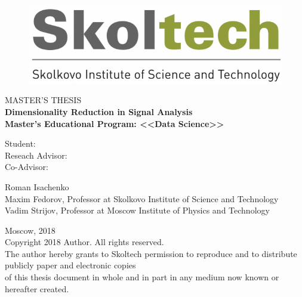 \documentclass[12pt,oneside]{article}
\theoremstyle{definition}
\newcommand{\borders}{\tikz[remember picture,overlay] \draw []
	(current page text area.south west)
	rectangle
	(current page text area.north east)
	;}
\begin{document}
	\pagestyle{empty}
	
	\begin{figure}
		\vspace{1.7cm}
		\centering
		\includegraphics[width=0.38\linewidth]{sk_logo}
	\end{figure}
	\begin{center}
		\sc
		MASTER'S THESIS\\[5mm]
		\bf{ \large
		Dimensionality Reduction in Signal Analysis}\\[25mm]
		\rm
		Master's Educational Program: <<Data Science>>\\[10mm]
	\end{center}
		\begin{minipage}{0.5\linewidth}
		\begin{flushright}
		Student: \hphantom{1}\\[12mm]
		Reseach Advisor: \hphantom{1}\\[12mm]
		Co-Advisor: \hphantom{1}\\
	\end{flushright}
	\end{minipage}%
	\begin{minipage}{0.48\linewidth}
			\vspace{.6cm}
			\begin{flushleft}
			Roman Isachenko\\[12mm]
			Maxim Fedorov, Professor at Skolkovo Institute of Science and Technology \\[6.8mm]
			Vadim Strijov, Professor at Moscow Institute of Physics and Technology
			\\
			\end{flushleft}
	\end{minipage}%

	\vfill
	\begin{center}
		Moscow, 2018 \\[9mm]
		\scriptsize{
		Copyright 2018 Author. All rights reserved. \\[7mm]
		
		The author hereby grants to Skoltech permission to reproduce and to distribute publicly paper and electronic copies \\ 
		of this thesis document in whole and in part in any medium now known or hereafter created.\\[15mm]}
	\end{center}
\end{document}
